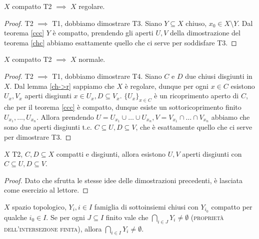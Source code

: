 \begin{lm} \label{ch->r}
  $X$ compatto T2 $\implies$ $X$ regolare.
\end{lm}

\begin{proof}
  T2 $\implies$ T1, dobbiamo dimostrare T3. Siano $Y \subseteq X$ chiuso, $x_0 \in X \setminus Y$. Dal teorema \ref{ccc} $Y$ è compatto, prendendo gli aperti $U, V$ della dimostrazione del teorema \ref{chc} abbiamo esattamente quello che ci serve per soddisfare T3.
\end{proof}

\begin{thm} \label{ch->n}
  $X$ compatto T2 $\implies$ $X$ normale.
\end{thm}

\begin{proof}
  T2 $\implies$ T1, dobbiamo dimostrare T4. Siano $C$ e $D$ due chiusi disgiunti in $X$. Dal lemma \ref{ch->r} sappiamo che $X$ è regolare, dunque per ogni $x \in C$ esistono $U_x, V_x$ aperti disgiunti $x \in U_x, D \subseteq V_x$. $\{U_x\}_{x \in C}$ è un ricoprimento aperto di $C$, che per il teorema \ref{ccc} è compatto, dunque esiste un sottoricoprimento finito $U_{x_1}, \dots, U_{x_n}$.
  Allora prendendo $U=U_{x_1} \cup \dots \cup U_{x_n}, V=V_{x_1} \cap \dots \cap V_{x_n}$ abbiamo che sono due aperti disgiunti t.c. $C \subseteq U, D \subseteq V$, che è esattamente quello che ci serve per dimostrare T3.
\end{proof}

\begin{prop}
  $X$ T2, $C, D \subseteq X$ compatti e disgiunti, allora esistono $U, V$ aperti disgiunti con $C \subseteq U, D \subseteq V$.
\end{prop}

\begin{proof}
  Dato che sfrutta le stesse idee delle dimostrazioni precedenti, è lasciata come esercizio al lettore.
\end{proof}

\begin{thm}
  $X$ spazio topologico, $Y_i, i \in I$ famiglia di sottoinsiemi chiusi con $Y_{i_0}$ compatto per qualche $i_0 \in I$. Se per ogni $J \subseteq I$ finito vale che $\displaystyle \bigcap_{i \in J} Y_i \not = \emptyset$ (\textsc{proprietà dell'intersezione finita}), allora $\displaystyle \bigcap_{i \in I} Y_i \not=\emptyset$.
\end{thm}

